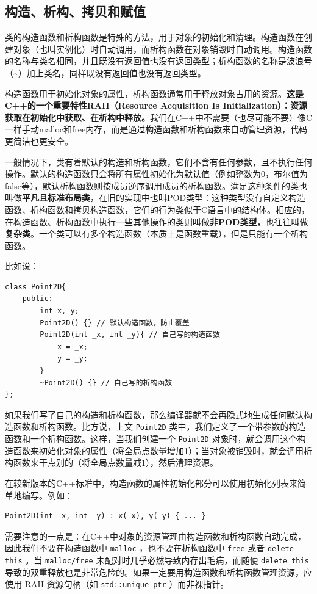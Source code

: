 \subsection{构造、析构、拷贝和赋值}

类的构造函数和析构函数是特殊的方法，用于对象的初始化和清理。构造函数在创建对象（也叫实例化）时自动调用，而析构函数在对象销毁时自动调用。构造函数的名称与类名相同，并且既没有返回值也没有返回类型；析构函数的名称是波浪号（\textasciitilde）加上类名，同样既没有返回值也没有返回类型。

构造函数用于初始化对象的属性，析构函数通常用于释放对象占用的资源。\textbf{这是C++的一个重要特性RAII（Resource Acquisition Is Initialization）：资源获取在初始化中获取、在析构中释放。}我们在C++中不需要（也尽可能不要）像C一样手动malloc和free内存，而是通过构造函数和析构函数来自动管理资源，代码更简洁也更安全。

一般情况下，类有着默认的构造和析构函数，它们不含有任何参数，且不执行任何操作。默认的构造函数只会将所有属性初始化为默认值（例如整数为0，布尔值为false等），默认析构函数则按成员逆序调用成员的析构函数。满足这种条件的类也叫做\textbf{平凡且标准布局类}，在旧的实现中也叫POD类型：这种类型没有自定义构造函数、析构函数和拷贝构造函数，它们的行为类似于C语言中的结构体。相应的，在构造函数、析构函数中执行一些其他操作的类则叫做\textbf{非POD类型}，也往往叫做\textbf{复杂类}。一个类可以有多个构造函数（本质上是函数重载），但是只能有一个析构函数。

比如说：
\begin{verbatim}
class Point2D{
    public:
        int x, y;
        Point2D() {} // 默认构造函数，防止覆盖
        Point2D(int _x, int _y){ // 自己写的构造函数
            x = _x;
            y = _y;
        }
        ~Point2D() {} // 自己写的析构函数
};
\end{verbatim}

如果我们写了自己的构造和析构函数，那么编译器就不会再隐式地生成任何默认构造函数和析构函数。比方说，上文 \texttt{Point2D} 类中，我们定义了一个带参数的构造函数和一个析构函数。这样，当我们创建一个 \texttt{Point2D} 对象时，就会调用这个构造函数来初始化对象的属性（将全局点数量增加1）；当对象被销毁时，就会调用析构函数来干点别的（将全局点数量减1），然后清理资源。

在较新版本的C++标准中，构造函数的属性初始化部分可以使用初始化列表来简单地编写。例如：
\begin{verbatim}
Point2D(int _x, int _y) : x(_x), y(_y) { ... }
\end{verbatim}

\begin{note}
  需要注意的一点是：在C++中对象的资源管理由构造函数和析构函数自动完成，因此我们不要在构造函数中 \texttt{malloc} ，也不要在析构函数中 \texttt{free} 或者 \texttt{delete this} 。当 \texttt{malloc/free} 未配对时几乎必然导致内存出毛病，而随便 \texttt{delete this} 导致的双重释放也是非常危险的。如果一定要用构造函数和析构函数管理资源，应使用 RAII 资源句柄（如  \texttt{std::unique\_ptr} ）而非裸指针。
\end{note}

